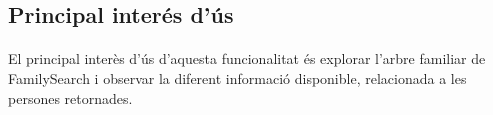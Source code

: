 \subsection{Principal interés d'ús}

\paragraph{}
El principal interès d'ús d'aquesta funcionalitat és explorar l'arbre familiar de FamilySearch i observar la diferent informació disponible, relacionada a les persones retornades.
